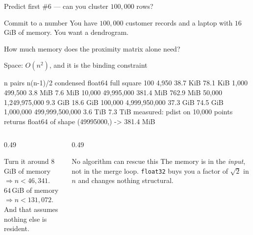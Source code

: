 \documentclass[aspectratio=169]{beamer}
\begin{document}
\begin{frame}{Predict first \#6 --- can you cluster $100{,}000$ rows?}
  \begin{alertblock}{Commit to a number}
    You have $100{,}000$ customer records and a laptop with $16$\,GiB of
    memory. You want a dendrogram.

    \medskip
    \centering\large
    How much memory does the proximity matrix alone need?
  \end{alertblock}
\end{frame}

\begin{frame}[fragile,shrink=6]{Space: $O(n^2)$, and it is the binding constraint}
\begin{outblk}
        n        pairs n(n-1)/2   condensed float64      full square
      100                4,950           38.7 KiB         78.1 KiB
    1,000              499,500            3.8 MiB          7.6 MiB
   10,000           49,995,000          381.4 MiB        762.9 MiB
   50,000        1,249,975,000            9.3 GiB         18.6 GiB
  100,000        4,999,950,000           37.3 GiB         74.5 GiB
1,000,000      499,999,500,000            3.6 TiB          7.3 TiB
measured: pdist on 10,000 points returns float64 of shape (49995000,) -> 381.4 MiB
\end{outblk}
  \vspace{0.2em}
  \begin{columns}[T]
    \begin{column}{0.49\textwidth}
      \begin{block}{Turn it around}
        \small
        $8$\,GiB of memory $\Rightarrow n < 46{,}341$.\\
        $64$\,GiB of memory $\Rightarrow n < 131{,}072$.\\
        And that assumes nothing else is resident.
      \end{block}
    \end{column}
    \begin{column}{0.49\textwidth}
      \begin{alertblock}{No algorithm can rescue this}
        \small The memory is in the \emph{input}, not in the merge loop.
        \texttt{float32} buys you a factor of $\sqrt{2}$ in $n$ and changes
        nothing structural.
      \end{alertblock}
    \end{column}
  \end{columns}
\end{frame}
\end{document}
